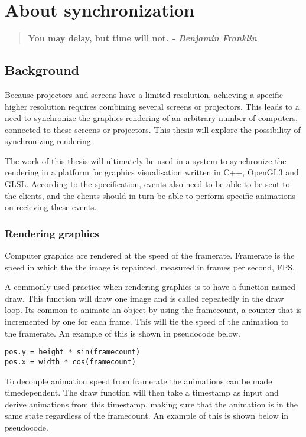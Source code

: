 \chapter{About synchronization}

\begin{quotation}
\bf You may delay, but time will not.
\rm \center \em - Benjamin Franklin
\end{quotation}

\section{Background}

Because projectors and screens have a limited resolution, achieving a specific higher resolution requires combining several screens or projectors. This leads to a need to synchronize the graphics-rendering of an arbitrary number of computers, connected to these screens or projectors. This thesis will explore the possibility of synchronizing rendering.

The work of this thesis will ultimately be used in a system to synchronize the rendering in a platform for graphics visualisation written in C++, OpenGL3 and GLSL. According to the specification, events also need to be able to be sent to the clients, and the clients should in turn be able to perform specific animations on recieving these events.  

\subsection{Rendering graphics}
Computer graphics are rendered at the speed of the framerate. Framerate is the speed in which the the image is repainted, measured in frames per second, FPS. 

A commonly used practice when rendering graphics is to have a function named draw. This function will draw one image and is called repeatedly in the draw loop. Its common to animate an object by using the framecount, a counter that is incremented by one for each frame. This will tie the speed of the animation to the framerate. An example of this is shown in pseudocode below.

\begin{verbatim}
pos.y = height * sin(framecount)
pos.x = width * cos(framecount)
\end{verbatim}

To decouple animation speed from framerate the animations can be made timedependent. The draw function will then take a timestamp as input and derive animations from this timestamp, making sure that the animation is in the same state regardless of the framecount. An example of this is shown below in pseudocode.

